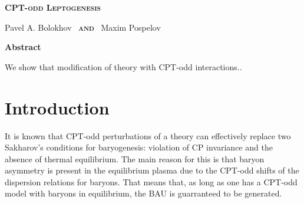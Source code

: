 \documentclass[12pt]{revtex4}
\begin{document}
\begin{titlepage}
\renewcommand{\thefootnote}{\fnsymbol{footnote}}

\vspace*{3.0cm}
\begin{center}
{\Large
  \textbf{
  \textsc{CPT-odd Leptogenesis}
         }
      }

\vspace*{1.0cm}
  {\large {}\selectfont Pavel A. Bolokhov~ 
        {\normalsize\bf \textsc{and}} ~Maxim Pospelov}

\vspace*{1.5cm}
{\large\bf Abstract}
\end{center}

        We show that modification of theory with CPT-odd interactions..

\end{titlepage}

%
%
\section{Introduction}

%
%
%
%
%
%


	It is known that CPT-odd perturbations of a theory can effectively
	replace two Sakharov's conditions for baryogenesis: violation of CP
	invariance and the absence of thermal equilibrium.
	The main reason for this is that baryon asymmetry is present in the
	equilibrium plasma due to the CPT-odd shifts of the dispersion relations
	for baryons.
	That means that, as long as one has a CPT-odd model with baryons in equilibrium,
	the BAU is guarranteed to be generated.
	
\end{document}
